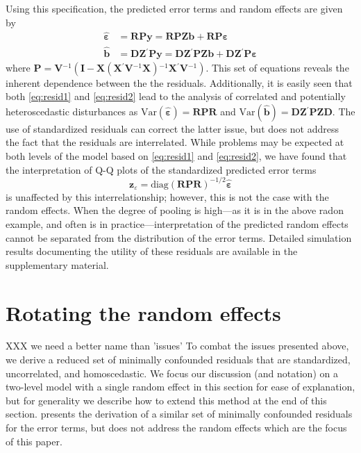 \documentclass{article} %
\newcommand{\hh}[1]{{\color{orange} #1}}
\newcommand{\al}[1]{{\color{red} #1}}
\newcommand{\inv}{\ensuremath{^{-1}}}
\newcommand{\trans}{\ensuremath{^\prime}}
\newcommand{\var}{\ensuremath{\mathrm{Var}}}
\begin{document}
Using this specification, the predicted error terms and random effects are given by 
%
\begin{align}
\widehat{\bm{\varepsilon}} &= \bm{RPy} = \bm{RPZb} + \bm{RP \varepsilon} \label{eq:resid1}\\
\widehat{\bm{b}} &= \bm{DZ}\trans \bm{Py} = \bm{DZ}\trans \bm{PZb} + \bm{DZ}\trans \bm{P \varepsilon} \label{eq:resid2}
\end{align}
%
where $\bm{P} = \bm{V}\inv( \bm{I} - \bm{X} (\bm{X}\trans \bm{V}\inv \bm{X})\inv \bm{X}\trans \bm{V}\inv)$. This  set of equations %
reveals the inherent dependence between the the residuals.
Additionally, it is easily seen that both \eqref{eq:resid1} and \eqref{eq:resid2} lead to the analysis of correlated and potentially heteroscedastic disturbances as $\var(\widehat{\bm{\varepsilon}}) = \bm{RPR}$ and $\var(\widehat{\bm{b}}) = \bm{DZ}\trans \bm{PZD}$.
\al{
The use of standardized residuals can correct the latter issue, but does not address the fact that the residuals are interrelated. While problems may be expected at both levels of the model based on \eqref{eq:resid1} and \eqref{eq:resid2}, we have found that the interpretation of Q-Q plots of the standardized predicted error terms
%
\[
\bm{z}_{\varepsilon} =  \text{diag} \left(\bm{RPR} \right)^{-1/2} \widehat{\bm{\varepsilon}}
\]
%
is unaffected by this interrelationship; however, this is not the case with the random effects.  When the degree of pooling is high---as it is in the above radon example, and often is in practice---interpretation of the predicted random effects cannot be separated from the distribution of the error terms. Detailed simulation results \hh{documenting} the utility of  these residuals are available in the supplementary material.
}


\section{Rotating the random effects}\label{sec:rotate}
\hh{XXX we need a better name than 'issues'}
To combat the issues presented above, we derive a reduced set of minimally confounded residuals that are standardized, uncorrelated, and homoscedastic. \al{We focus our discussion (and notation) on a two-level model with a single random effect in this section for ease of explanation, but for generality we describe how to extend this method at the end of this section.} \cite{HildenMinton:1995wh} presents the derivation of a similar set of minimally confounded residuals for the error terms, but does not address the random effects which are the focus of this paper. 
\end{document}
